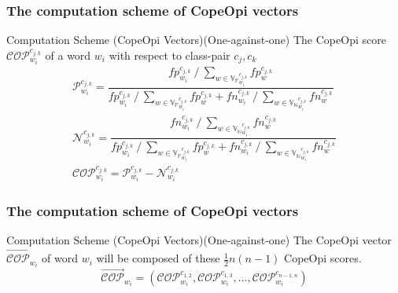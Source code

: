 \documentclass[mathserif]{beamer}
\DeclareMathOperator*{\divby}{/}
\begin{document}
\begin{frame}
\frametitle{The computation scheme of CopeOpi vectors}
\begin{block}{Computation Scheme (CopeOpi Vectors)(One-against-one)}
The CopeOpi score $\mathcal{COP}^{c_{j,k}}_{w_i}$ of a word $w_i$ with respect to class-pair $c_j,c_k$
\begin{equation*}
\begin{gathered}
\mathcal{P}^{c_{j,k}}_{w_i} = \dfrac {
	fp^{c_{j,k}}_{w_i} \divby \sum_{w \in {\mathbb{V}_\mathbb{P}}^{c_{j,k}}_{w_i}} fp^{c_{j,k}}_w
}{
	fp^{c_{j,k}}_{w_i} \divby \sum_{w \in {\mathbb{V}_\mathbb{P}}^{c_{j,k}}_{w_i}} fp^{c_{j,k}}_w +
	fn^{c_{j,k}}_{w_i} \divby \sum_{w \in {\mathbb{V}_\mathbb{N}}^{c_{j,k}}_{w_i}} fn^{c_{j,k}}_w
}
\\
\mathcal{N}^{c_{j,k}}_{w_i} = \dfrac {
	fn^{c_{j,k}}_{w_i} \divby \sum_{w \in {\mathbb{V}_\mathbb{N}}^{c_{j,k}}_{w_i}} fn^{c_{j,k}}_w
}{
	fp^{c_{j,k}}_{w_i} \divby \sum_{w \in {\mathbb{V}_\mathbb{P}}^{c_{j,k}}_{w_i}} fp^{c_{j,k}}_w +
	fn^{c_{j,k}}_{w_i} \divby \sum_{w \in {\mathbb{V}_\mathbb{N}}^{c_{j,k}}_{w_i}} fn^{c_{j,k}}_w
}
\\
\mathcal{COP}^{c_{j,k}}_{w_i} = \mathcal{P}^{c_{j,k}}_{w_i} - \mathcal{N}^{c_{j,k}}_{w_i}
\end{gathered}
\end{equation*}
\end{block}
\begin{flushright}
\vspace{-9.5ex}
\end{flushright}
\end{frame}

\begin{frame}
\frametitle{The computation scheme of CopeOpi vectors}
\begin{block}{Computation Scheme (CopeOpi Vectors)(One-against-one)}
The CopeOpi vector $\overrightarrow{\mathcal{COP}}_{w_i}$ of word $w_i$ will be composed of these $\frac{1}{2}n(n-1)$ CopeOpi scores.
\begin{equation*}
\overrightarrow{\mathcal{COP}}_{w_i} = (\mathcal{COP}^{c_{1,2}}_{w_i},\mathcal{COP}^{c_{1,3}}_{w_i},\dots,\mathcal{COP}^{c_{n-1,n}}_{w_i})
\end{equation*}
\end{block}
\end{frame}
\end{document}
